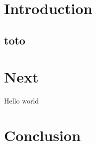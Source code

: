 \documentclass[a4paper,12pt]{article}
\begin{document}


\tableofcontents

\newpage

\section{Introduction}
\subsection{toto}

\section{Next}
Hello world

\section{Conclusion}
\end{document}
